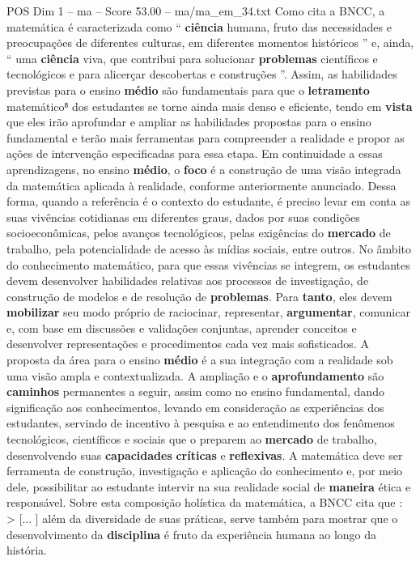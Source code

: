 \begin{textsample}{POS Dim 1 – ma – Score 53.00 – ma/ma\_em\_34.txt}
Como cita a BNCC, a matemática é caracterizada como “ \textbf{ciência} humana, fruto das necessidades e preocupações de diferentes culturas, em diferentes momentos históricos ” e, ainda, “ uma \textbf{ciência} viva, que contribui para solucionar \textbf{problemas} científicos e tecnológicos e para alicerçar descobertas e construções ”.
Assim, as habilidades previstas para o ensino \textbf{médio} são fundamentais para que o \textbf{letramento} matemático⁸ dos estudantes se torne ainda mais denso e eficiente, tendo em \textbf{vista} que eles irão aprofundar e ampliar as habilidades propostas para o ensino fundamental e terão mais ferramentas para compreender a realidade e propor as ações de intervenção especificadas para essa etapa.
Em continuidade a essas aprendizagens, no ensino \textbf{médio}, o \textbf{foco} é a construção de uma visão integrada da matemática aplicada à realidade, conforme anteriormente anunciado.
Dessa forma, quando a referência é o contexto do estudante, é preciso levar em conta as suas vivências cotidianas em diferentes graus, dados por suas condições socioeconômicas, pelos avanços tecnológicos, pelas exigências do \textbf{mercado} de trabalho, pela potencialidade de acesso às mídias sociais, entre outros.
No âmbito do conhecimento matemático, para que essas vivências se integrem, os estudantes devem desenvolver habilidades relativas aos processos de investigação, de construção de modelos e de resolução de \textbf{problemas}.
Para \textbf{tanto}, eles devem \textbf{mobilizar} seu modo próprio de raciocinar, representar, \textbf{argumentar}, comunicar e, com base em discussões e validações conjuntas, aprender conceitos e desenvolver representações e procedimentos cada vez mais sofisticados.
A proposta da área para o ensino \textbf{médio} é a sua integração com a realidade sob uma visão ampla e contextualizada.
A ampliação e o \textbf{aprofundamento} são \textbf{caminhos} permanentes a seguir, assim como no ensino fundamental, dando significação aos conhecimentos, levando em consideração as experiências dos estudantes, servindo de incentivo à pesquisa e ao entendimento dos fenômenos tecnológicos, científicos e sociais que o preparem ao \textbf{mercado} de trabalho, desenvolvendo suas \textbf{capacidades} \textbf{críticas} e \textbf{reflexivas}.
A matemática deve ser ferramenta de construção, investigação e aplicação do conhecimento e, por meio dele, possibilitar ao estudante intervir na sua realidade social de \textbf{maneira} ética e responsável.
Sobre esta composição holística da matemática, a BNCC cita que : > [... ] além da diversidade de suas práticas, serve também para mostrar que o desenvolvimento da \textbf{disciplina} é fruto da experiência humana ao longo da história.

\end{textsample}
